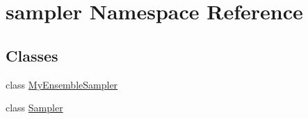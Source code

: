\hypertarget{namespacesampler}{}\section{sampler Namespace Reference}
\label{namespacesampler}
\subsection*{Classes}
\begin{DoxyCompactItemize}
\item 
class \hyperlink{classsampler_1_1MyEnsembleSampler}{My\+Ensemble\+Sampler}
\item 
class \hyperlink{classsampler_1_1Sampler}{Sampler}
\end{DoxyCompactItemize}
